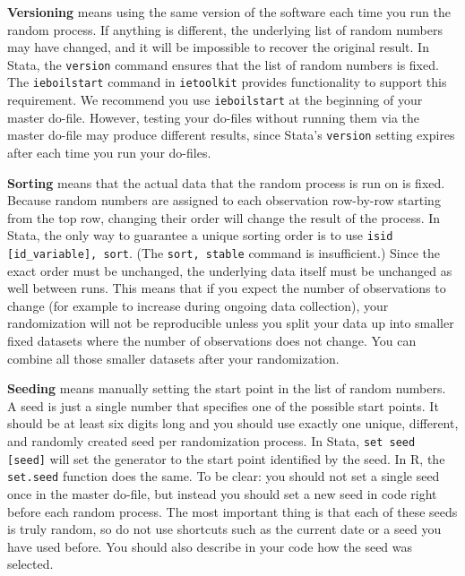 \textbf{Versioning} means using the same version of the software each time you run the random process.
If anything is different, the underlying list of random numbers may have changed,
and it will be impossible to recover the original result.
In Stata, the \texttt{version} command ensures that the list of random numbers is fixed.
The \texttt{ieboilstart} command in \texttt{ietoolkit} provides functionality to support this requirement.
We recommend you use \texttt{ieboilstart} at the beginning of your master do-file.
However, testing your do-files without running them
via the master do-file may produce different results,
since Stata's \texttt{version} setting expires after each time you run your do-files.

\textbf{Sorting} means that the actual data that the random process is run on is fixed.
Because random numbers are assigned to each observation row-by-row starting from
the top row,
changing their order will change the result of the process.
In Stata, the only way to guarantee a unique sorting order is to use
\texttt{isid [id\_variable], sort}.
(The \texttt{sort, stable} command is insufficient.)
Since the exact order must be unchanged,
the underlying data itself must be unchanged as well between runs.
This means that if you expect the number of observations to change
(for example to increase during ongoing data collection),
your randomization will not be reproducible unless you split your data up into
smaller fixed datasets where the number of observations does not change.
You can combine all
those smaller datasets after your randomization.


\textbf{Seeding} means manually setting the start point in the list of random numbers.
A seed is just a single number that specifies one of the possible start points.
It should be at least six digits long and you should use exactly
one unique, different, and randomly created seed per randomization process.
In Stata, \texttt{set seed [seed]} will set the generator
to the start point identified by the seed.
In R, the \texttt{set.seed} function does the same.
To be clear: you should not set a single seed once in the master do-file,
but instead you should set a new seed in code right before each random process.
The most important thing is that each of these seeds is truly random,
so do not use shortcuts such as the current date or a seed you have used before.
You should also describe in your code how the seed was selected.

